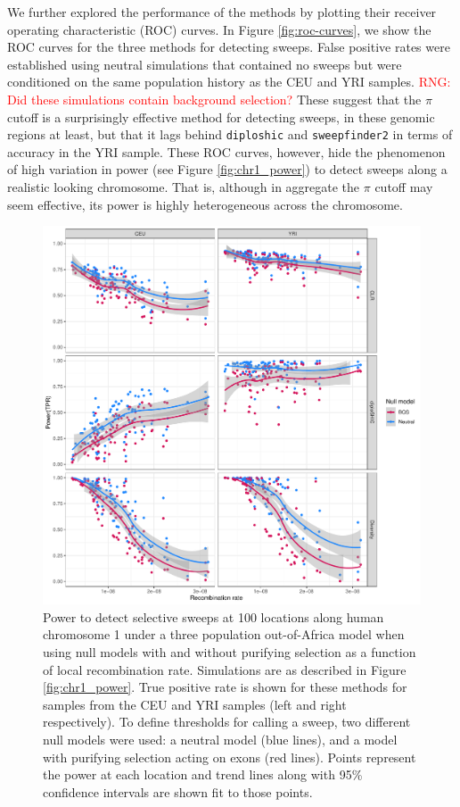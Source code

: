 \documentclass[hidelinks]{article}
\newcommand{\stdpopsim}{\texttt{stdpopsim}\xspace}
\newcommand{\sweepfinder}{\texttt{sweepfinder2}\xspace}
\newcommand{\diploshic}{\texttt{diploshic}\xspace}
\newcommand{\rngcomment}[1]{\textcolor{red}{RNG: #1}}
\begin{document}
    We further explored the performance of the methods by plotting their receiver operating characteristic (ROC) curves.
    In Figure \ref{fig:roc-curves}, we show the ROC curves for the three methods for detecting sweeps.
    False positive rates were established using neutral simulations that contained no sweeps
    but were conditioned on the same population history as the CEU and YRI samples. \rngcomment{Did these simulations contain background selection?}
    These suggest that the $\pi$ cutoff is a surprisingly effective method for detecting sweeps,
    in these genomic regions at least, but that it lags behind \diploshic and \sweepfinder in terms of accuracy in the YRI sample.
    These ROC curves, however, hide the phenomenon of high variation in power (see Figure \ref{fig:chr1_power}) to detect sweeps along a realistic looking chromosome.
    That is, although in aggregate the $\pi$ cutoff may seem effective, its power is highly heterogeneous across the chromosome.


    \begin{figure}
        \centering
        \includegraphics[width=0.8 \textwidth]{figures/sweeps/relationship_power_cM.pdf}
        \caption{
        Power to detect selective sweeps at 100 locations along human
        chromosome 1 under a three population out-of-Africa model
        \citep{gutenkunst2009inferring}  when using null models with and
        without purifying selection as a function of local recombination rate.
        Simulations are as described in Figure \ref{fig:chr1_power}.  True
        positive rate is shown for these methods for samples from the CEU and
        YRI samples (left and right respectively).  To define thresholds for
        calling a sweep, two different null models were used: a neutral model
        (blue lines), and a model with purifying selection acting on exons (red
        lines).  Points represent the power at each location and trend lines
        along with 95\% confidence intervals are shown fit to those points.
        }
        \label{fig:power-recomb}
    \end{figure}
\end{document}

